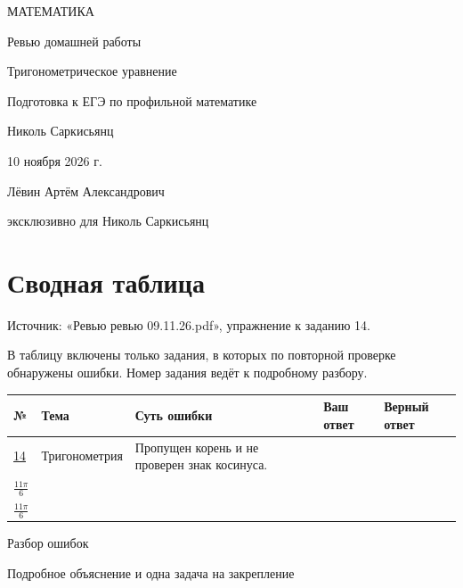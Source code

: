 \documentclass[a4paper,12pt]{article}
\begin{document}
\thispagestyle{empty}
\begin{center}
\vspace*{28mm}
{\color{darkaccent}\large МАТЕМАТИКА}\par\vspace{15mm}
{\Huge Ревью домашней работы}\par\vspace{11mm}
{\fontsize{17}{23}\selectfont\color{accent}Тригонометрическое уравнение}\par\vspace{15mm}
{\small Подготовка к ЕГЭ по профильной математике}\par
\vfill
{\normalsize Николь Саркисьянц}\par\vspace{8mm}
{\normalsize 10 ноября 2026 г.}\par\vspace{12mm}
{\small Лёвин Артём Александрович}\par
{\small эксклюзивно для Николь Саркисьянц}\par\vspace{12mm}
\end{center}
\clearpage
\section*{Сводная таблица}
\textcolor{darkaccent}{Источник:} «Ревью ревью 09.11.26.pdf», упражнение к заданию 14.

В таблицу включены только задания, в которых по повторной проверке обнаружены ошибки. Номер задания ведёт к подробному разбору.
\par\par\vspace{4mm}
\small\renewcommand{\arraystretch}{1.35}
\begin{tabularx}{\linewidth}{@{}p{12mm}p{27mm}X p{32mm}p{35mm}@{}}
\toprule
\textbf{№} & \textbf{Тема} & \textbf{Суть ошибки} & \textbf{Ваш ответ} & \textbf{Верный ответ}\\\midrule
\hyperref[task:14]{14} & Тригонометрия & Пропущен корень и не проверен знак косинуса. & \shortstack[l]{$\frac\pi2,\ \frac{7\pi}6,$\\$\frac{11\pi}6$} & \shortstack[l]{$\frac\pi2,\ \frac{3\pi}2,$\\$\frac{11\pi}6$}\\
\bottomrule
\end{tabularx}
\normalsize
\clearpage
\thispagestyle{empty}
\vspace*{\fill}
\begin{center}{\fontsize{25}{30}\selectfont\color{darkaccent}Разбор ошибок}\par\vspace{5mm}
{\large Подробное объяснение и одна задача на закрепление}\end{center}
\vspace*{\fill}
\clearpage
{}\label{task:14}
\end{document}
